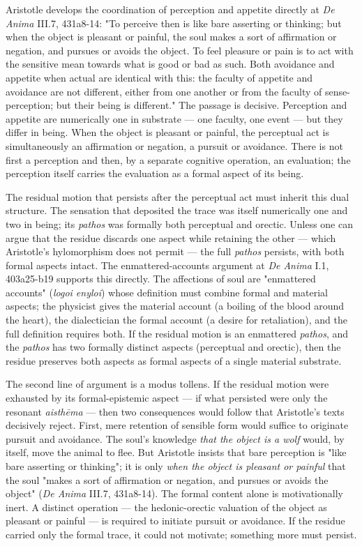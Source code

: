 \documentclass[12pt]{article}
\begin{document}
Aristotle develops the coordination of perception and appetite directly at \textit{De Anima} III.7, 431a8-14: "To perceive then is like bare asserting or thinking; but when the object is pleasant or painful, the soul makes a sort of affirmation or negation, and pursues or avoids the object. To feel pleasure or pain is to act with the sensitive mean towards what is good or bad as such. Both avoidance and appetite when actual are identical with this: the faculty of appetite and avoidance are not different, either from one another or from the faculty of sense-perception; but their being is different." The passage is decisive. Perception and appetite are numerically one in substrate --- one faculty, one event --- but they differ in being. When the object is pleasant or painful, the perceptual act is simultaneously an affirmation or negation, a pursuit or avoidance. There is not first a perception and then, by a separate cognitive operation, an evaluation; the perception itself carries the evaluation as a formal aspect of its being.

The residual motion that persists after the perceptual act must inherit this dual structure. The sensation that deposited the trace was itself numerically one and two in being; its \textit{pathos} was formally both perceptual and orectic. Unless one can argue that the residue discards one aspect while retaining the other --- which Aristotle's hylomorphism does not permit --- the full \textit{pathos} persists, with both formal aspects intact. The enmattered-accounts argument at \textit{De Anima} I.1, 403a25-b19 supports this directly. The affections of soul are "enmattered accounts" (\textit{logoi enyloi}) whose definition must combine formal and material aspects; the physicist gives the material account (a boiling of the blood around the heart), the dialectician the formal account (a desire for retaliation), and the full definition requires both. If the residual motion is an enmattered \textit{pathos}, and the \textit{pathos} has two formally distinct aspects (perceptual and orectic), then the residue preserves both aspects as formal aspects of a single material substrate.

The second line of argument is a modus tollens. If the residual motion were exhausted by its formal-epistemic aspect --- if what persisted were only the resonant \textit{aisthēma} --- then two consequences would follow that Aristotle's texts decisively reject. First, mere retention of sensible form would suffice to originate pursuit and avoidance. The soul's knowledge \textit{that the object is a wolf} would, by itself, move the animal to flee. But Aristotle insists that bare perception is "like bare asserting or thinking"; it is only \textit{when the object is pleasant or painful} that the soul "makes a sort of affirmation or negation, and pursues or avoids the object" (\textit{De Anima} III.7, 431a8-14). The formal content alone is motivationally inert. A distinct operation --- the hedonic-orectic valuation of the object as pleasant or painful --- is required to initiate pursuit or avoidance. If the residue carried only the formal trace, it could not motivate; something more must persist.
\end{document}
